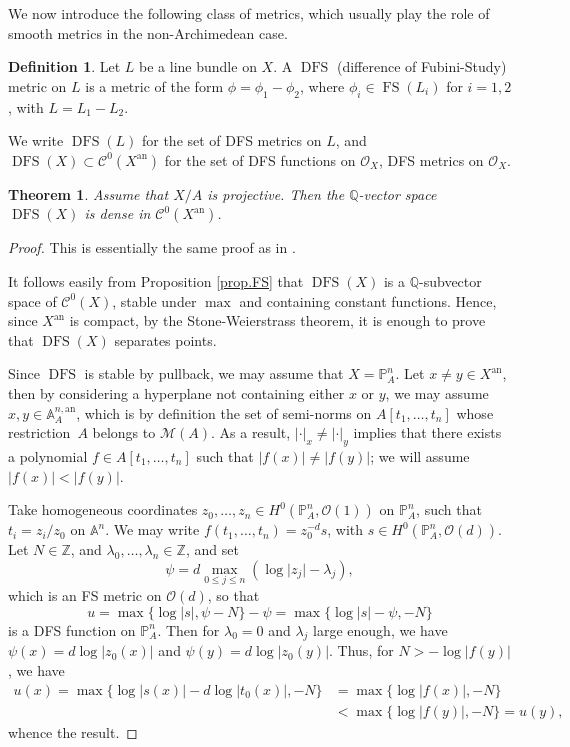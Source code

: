 \documentclass[JEP,XML,SOM,Unicode,published]{cedram}
\newtheorem{theo}[equation]{Theorem}
\theoremstyle{definition}
\newtheorem{defn}[equation]{Definition}
\newcommand \A {\mathbb A}
\newcommand \CP {\mathbb P}
\newcommand \Q{\mathbb Q}
\newcommand \Z{\mathbb Z}
\newcommand \gO {\mathcal O}
\newcommand \M {\mathscr {M}}
\newcommand{\an}{\mathrm{an}}
\DeclareMathOperator{\DFS}{DFS}
\DeclareMathOperator{\FS}{FS}
\begin{document}
We now introduce the following class of metrics, which usually play the role of smooth metrics in the non-Archimedean case.
\begin{defn} Let $L$ be a line bundle on $X$.
A $\DFS$ (difference of Fubini-Study) metric on $L$ is a metric of the form $\phi = \phi_1 - \phi_2$, where $\phi_i \in \FS(L_i)$ for $i=1,2$, with $L=L_1-L_2$.

We write $\DFS(L)$ for the set of DFS metrics on $L$, and $\DFS(X) \subset \mathcal{C}^0(X^{\an})$ for the set of DFS functions on $\gO_X$, \ie DFS metrics on $\gO_X$.
\end{defn}
\begin{theo}
Assume that $X/A$ is projective. Then the $\Q$-vector space $\DFS(X)$ is dense in $\mathcal{C}^0(X^{\an})$.
\end{theo}
\begin{proof}
This is essentially the same proof as in \cite[Th.\,2.7]{BJtriv}.

It follows easily from Proposition \ref{prop.FS} that $\DFS(X)$ is a $\Q$-subvector space of $\mathcal{C}^0(X)$, stable under $\max$ and containing constant functions. Hence, since $X^{\an}$ is compact, by the Stone-Weierstrass theorem, it is enough to prove that $\DFS(X)$ separates points.

Since $\DFS$ is stable by pullback, we may assume that $X = \CP_A^n$. Let $x \neq y \in X^{\an}$, then by considering a hyperplane not containing either $x$ or $y$, we may assume $x, y \in \A^{n, \an}_A$, which is by definition the set of semi-norms on $A[t_1,\dots,t_n]$ whose restriction~$A$ belongs to $\M(A)$. As a result, $\lvert \cdot \rvert_x \neq \lvert \cdot \rvert_y$ implies that there exists a polynomial $f \in A[t_1,\dots,t_n]$ such that $\lvert f(x) \rvert \neq \lvert f(y) \rvert$; we will assume $\lvert f(x) \rvert < \lvert f(y) \rvert$.

Take homogeneous coordinates $z_0,\dots,z_n \in H^0(\CP^n_A, \gO(1))$ on $\CP^n_A$, such that $t_i = z_i/z_0$ on $\A^n$. We may write $f(t_1,\dots,t_n) = z_0^{-d} s$, with $s \in H^0(\CP^n_A, \gO(d))$.
Let $N \in \Z$, and $\lambda_0,\dots, \lambda_n \in \Z$, and set
\[
\psi = d \max_{0 \le j \le n} (\log \lvert z_j \rvert - \lambda_j),
\]
which is an FS metric on $\gO(d)$, so that
\[
u = \max \{ \log \lvert s \rvert, \psi -N \} - \psi= \max \{ \log \lvert s \rvert - \psi, -N \}
\]
is a DFS function on $\CP^{n}_A$.
Then for $\lambda_0 =0$ and $\lambda_j$ large enough, we have $\psi(x) = d \log \lvert z_0(x) \rvert$ and $\psi(y) =d \log \lvert z_0(y) \rvert$.
Thus, for $N> - \log \lvert f (y) \rvert$, we have
\begin{align*}
u(x) = \max \{ \log \lvert s(x) \rvert - d \log \lvert t_0(x) \vert, -N \} &= \max \{ \log \lvert f(x) \rvert, -N \}\\
&< \max \{ \log \lvert f(y) \rvert, -N \} = u(y),
\end{align*}
whence the result.
\end{proof}
\end{document}
